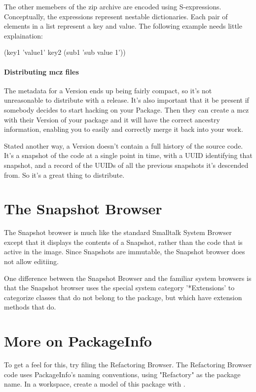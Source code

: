 \documentclass[a4paper,10pt,twoside]{book}
\begin{document}
The other memebers of the zip archive are encoded using S-expressions. Conceptually, the expressions represent nestable dictionaries. Each pair of elements in a list represent a key and value. The following example needs little explaination:

(key1 'value1' key2 (sub1 'sub value 1'))

\paragraph{Distributing mcz files}

The metadata for a Version ends up being fairly compact, so it's not unreasonable to distribute with a release. It's also important that it be present if somebody decides to start hacking on your Package. Then they can create a mcz with their Version of your package and it will have the correct ancestry information, enabling you to easily and correctly merge it back into your work.

Stated another way, a Version doesn't contain a full history of the source code. It's a snapshot of the code at a single point in time, with a UUID identifying that snapshot, and a record of the UUIDs of all the previous snapshots it's descended from. So it's a great thing to distribute.



\section{The Snapshot Browser}

The Snapshot browser is much like the standard Smalltalk System Browser except that it displays the contents of a Snapshot, rather than the code that is active in the image. Since Snapshots are immutable, the Snapshot browser does not allow editiing.

One difference between the Snapshot Browser and the familiar system browsers is that the Snapshot browser uses the special system category '*Extensions' to categorize classes that do not belong to the package, but which have extension methods that do.

\section{More on PackageInfo}
To get a feel for this, try filing the Refactoring Browser. The Refactoring Browser code uses PackageInfo's naming conventions, using "Refactory" as the package name. In a workspace, create a model of this package with  . 
\end{document}
